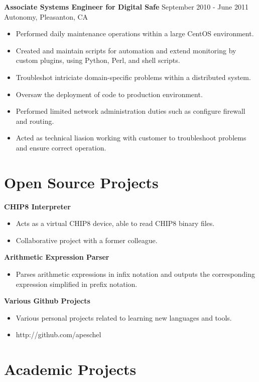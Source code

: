 \documentclass[10pt,line,margin,letterpaper]{res}
\begin{document}
\begin{resume}
    {\bf Associate Systems Engineer for Digital Safe} \hfill September 2010 - June 2011 \\
    Autonomy, Pleasanton, CA
    \begin{itemize} \itemsep -2pt
    \item Performed daily maintenance operations within a large CentOS environment.
    \item Created and maintain scripts for automation and extend monitoring by custom plugins, using Python, Perl, and shell scripts.
    \item Troubleshot intriciate domain-specific problems within a distributed system.
    \item Oversaw the deployment of code to production environment.
    \item Performed limited network administration duties such as configure firewall and routing.
    \item Acted as technical liasion working with customer to troubleshoot problems and ensure correct operation.
    \end{itemize}

\section {Open Source Projects}

    {\bf CHIP8 Interpreter}
    \begin{itemize} \itemsep -2pt
    \item Acts as a virtual CHIP8 device, able to read CHIP8 binary files.
    \item Collaborative project with a former colleague.
    \end{itemize}

    {\bf Arithmetic Expression Parser}
    \begin{itemize} \itemsep -2pt
    \item Parses arithmetic expressions in infix notation and outputs the corresponding expression simplified in prefix notation.
    \end{itemize}

    {\bf Various Github Projects}
    \begin{itemize} \itemsep -2pt
    \item Various personal projects related to learning new languages and tools.
    \item http://github.com/apeschel
    \end{itemize}

\section {Academic Projects}


\end{resume}
\end{document}
